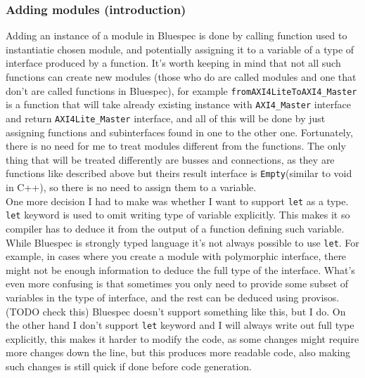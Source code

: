 \documentclass[14pt]{report}
\begin{document}
\subsubsection*{Adding modules (introduction)}
Adding an instance of a module in Bluespec is done by calling function used to instantiatie chosen module, and potentially assigning it to a variable of a type of interface produced by a function. It's worth keeping in mind that not all such functions can create new modules (those who do are called modules and one that don't are called functions in Bluespec), for example \verb!fromAXI4LiteToAXI4_Master! is a function that will take already existing instance with \verb!AXI4_Master! interface and return \verb!AXI4Lite_Master! interface, and all of this will be done by just assigning functions and subinterfaces found in one to the other one. Fortunately, there is no need for me to treat modules different from the functions. The only thing that will be treated differently are busses and connections, as they are functions like described above but theirs result interface is \verb!Empty!(similar to void in C++), so there is no need to assign them to a variable.
\\
One more decision I had to make was whether I want to support \verb!let! as a type. \verb!let! keyword is used to omit writing type of variable explicitly. This makes it so compiler has to deduce it from the output of a function defining such variable. While Bluespec is strongly typed language it's not always possible to use \verb!let!. For example, in cases where you create a module with polymorphic interface, there might not be enough information to deduce the full type of the interface. What's even more confusing is that sometimes you only need to provide some subset of variables in the type of interface, and the rest can be deduced using provisos. (TODO check this) Bluespec doesn't support something like this, but I do. On the other hand I don't support \verb!let! keyword and I will always write out full type explicitly, this makes it harder to modify the code, as some changes might require more changes down the line, but this produces more readable code, also making such changes is still quick if done before code generation.
\end{document}
